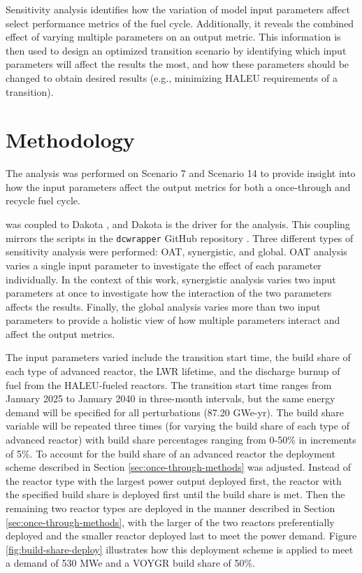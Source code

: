 Sensitivity analysis identifies how the variation of model input
parameters affect select performance 
metrics of the fuel cycle. Additionally, it reveals the combined effect 
of varying multiple parameters on 
an output metric. This information is then used to design 
an optimized transition scenario by identifying which input parameters 
will affect the results the most, and how these parameters should be 
changed to obtain desired results (e.g., minimizing \gls{HALEU} requirements
of a transition). 

\section{Methodology}
The analysis was performed on Scenario 7 and Scenario 
14 to provide insight into how the input parameters affect the output 
metrics for both a once-through and recycle fuel cycle. 

\Cyclus was coupled to Dakota \cite{adams_dakota_2019},
and Dakota is the driver for the analysis. This coupling mirrors  
the scripts in the \texttt{dcwrapper} GitHub repository \cite{chee_arfcdcwrapper_2019}.
Three different types 
of sensitivity analysis were performed: \acrfull{OAT}, synergistic, 
and global. \gls{OAT} analysis varies a single input parameter to 
investigate the effect of each parameter individually. In the context of 
this work, synergistic 
analysis varies two input parameters at once to investigate how the 
interaction of the two parameters affects the results. Finally, the global 
analysis varies more than two input parameters to provide a holistic 
view of how multiple parameters interact and affect the output metrics. 

The input parameters varied include the transition 
start time, the build share of each type of advanced reactor, 
the \gls{LWR} lifetime, and the discharge burnup of fuel from the 
\gls{HALEU}-fueled reactors. The transition start time ranges from January 
2025 to January 2040 in three-month intervals, but the same energy demand 
will be specified for all perturbations (87.20 GWe-yr). The build share 
variable will be repeated three times (for varying the build share of each 
type of advanced reactor) with build share percentages ranging from 0-50\% 
in increments of 5\%. To account for the build share of an advanced reactor
the deployment scheme described in Section \ref{sec:once-through-methods}
was adjusted. Instead of the reactor type with the largest power output 
deployed first, the reactor with the specified build share is deployed first 
until the build share is met. Then the remaining two reactor types are 
deployed in the manner described in Section \ref{sec:once-through-methods},
with the larger of the two reactors preferentially deployed and the smaller 
reactor deployed last to meet the power demand. Figure \ref{fig:build-share-deploy}
illustrates how this deployment scheme is applied to meet a demand of 530 
MWe and a VOYGR build share of 50\%. 

